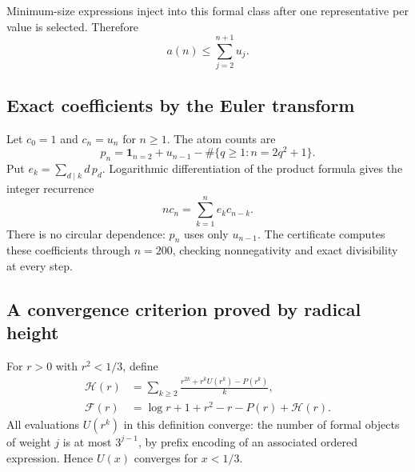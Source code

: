 \documentclass[11pt,letterpaper]{article}
\numberwithin{equation}{section}
\theoremstyle{definition}
\begin{document}
Minimum-size expressions inject into this formal class after one
representative per value is selected. Therefore
\begin{equation}\label{eq:au}
 a(n)\le\sum_{j=2}^{n+1}u_j.
\end{equation}

\subsection{Exact coefficients by the Euler transform}

Let $c_0=1$ and $c_n=u_n$ for $n\ge1$. The atom counts are
\[
 p_n=\boldsymbol1_{n=2}+u_{n-1}
       -\#\{q\ge1:n=2q^2+1\}.
\]
Put $e_k=\sum_{d\mid k}d\,p_d$. Logarithmic differentiation of the product
formula gives the integer recurrence
\begin{equation}\label{eq:euler}
 n c_n=\sum_{k=1}^n e_kc_{n-k}.
\end{equation}
There is no circular dependence: $p_n$ uses only $u_{n-1}$.
The certificate computes these coefficients through $n=200$, checking
nonnegativity and exact divisibility at every step.

\subsection{A convergence criterion proved by radical height}

For $r>0$ with $r^2<1/3$, define
\begin{align}
 \mathcal H(r)&=\sum_{k\ge2}
   \frac{r^{2k}+r^kU(r^k)-P(r^k)}k,\label{eq:Htaildef}\\
 \mathcal F(r)&=\log r+1+r^2-r-P(r)+\mathcal H(r).\label{eq:Fcriterion}
\end{align}
All evaluations $U(r^k)$ in this definition converge: the number of formal
objects of weight $j$ is at most $3^{j-1}$, by prefix encoding of an associated
ordered expression. Hence $U(x)$ converges for $x<1/3$.
\end{document}
